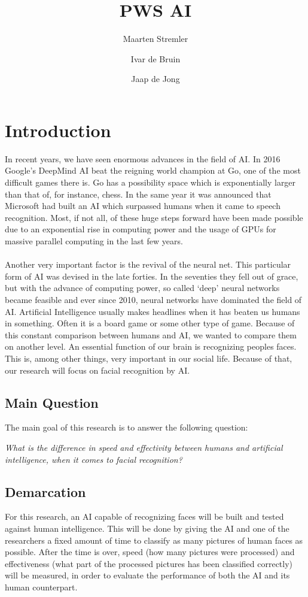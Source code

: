 \documentclass[12pt, titlepage]{article}
\title{PWS AI}
\author{Maarten Stremler \and Ivar de Bruin \and Jaap de Jong}
\let\oldsection\section
\renewcommand\section{\clearpage\oldsection}
\begin{document}
    \maketitle
    \tableofcontents
    
\section{Introduction}
    In recent years, we have seen enormous advances in the field of AI. In 2016 Google's DeepMind AI beat the reigning world champion at Go, one of the most difficult games there is\cite{byford16}. Go has a possibility space which is exponentially larger than that of, for instance, chess. In the same year it was announced that Microsoft had built an AI which surpassed humans when it came to speech recognition.
    Most, if not all, of these huge steps forward have been made possible due to an exponential rise in computing power and the usage of GPUs for massive parallel computing in the last few years.
    \\
    \\
    Another very important factor is the revival of the neural net. This particular form of AI was devised in the late forties. In the seventies they fell out of grace, but with the advance of computing power, so called ‘deep’ neural networks became feasible and ever since 2010, neural networks have dominated the field of AI.\cite{kuzovkin16}\cite{foote17} Artificial Intelligence usually makes headlines when it has beaten us humans in something. Often it is a board game or some other type of game. Because of this constant comparison between humans and AI, we wanted to compare them on another level. An essential function of our brain is recognizing peoples faces. This is, among other things, very important in our social life. Because of that, our research will focus on facial recognition by AI.
    
    \subsection{Main Question}
    The main goal of this research is to answer the following question:
    \begin{center}
        \textit{What is the difference in speed and effectivity between humans and artificial intelligence, when it comes to facial recognition?}
    \end{center}
    
    \subsection{Demarcation}
    For this research, an AI capable of recognizing faces will be built and tested against human intelligence. This will be done by giving the AI and one of the researchers a fixed amount of time to classify as many pictures of human faces as possible. After the time is over, speed (how many pictures were processed) and effectiveness (what part of the processed pictures has been classified correctly) will be measured, in order to evaluate the performance of both the AI and its human counterpart.
\end{document}
